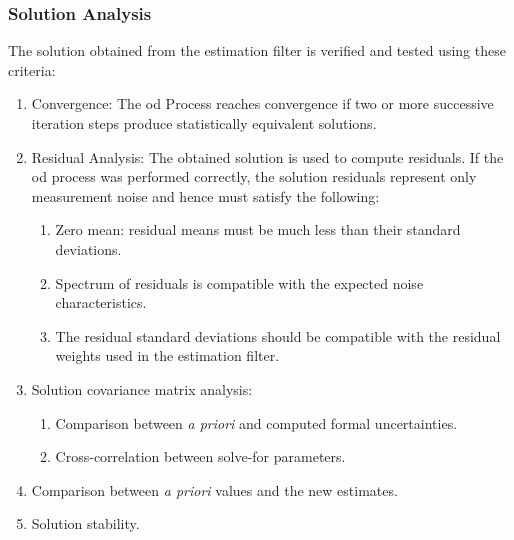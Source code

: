 \documentclass{article}
\begin{document}
                \subsubsection{\footnotesize{Solution Analysis}}
                    The solution obtained from the estimation filter
                    is verified and tested using these criteria:
                    \begin{enumerate}
                        \item Convergence: The \gls{od}
                              Process reaches convergence if two
                              or more successive iteration steps
                              produce statistically equivalent
                              solutions.
                        \item Residual Analysis: The obtained
                              solution is used to compute
                              \glspl{residual}. If the \gls{od}
                              process was performed correctly,
                              the solution \glspl{residual}
                              represent only measurement noise
                              and hence must satisfy the following:
                    \begin{enumerate}
                        \item Zero mean: \Gls{residual} means must be much
                              less than their standard deviations.
                        \item Spectrum of \glspl{residual} is compatible with
                              the expected noise characteristics.
                        \item The \gls{residual} standard deviations should be
                              compatible with the \gls{residual} weights used
                              in the estimation filter.
                    \end{enumerate}
                        \item Solution \gls{covariance matrix} analysis:
                        \begin{enumerate}
                        \item Comparison between \textit{a priori} and computed formal uncertainties.
                        \item Cross-correlation between \gls{solve-for parameters}.
                        \end{enumerate}
                        \item Comparison between \textit{a priori} values and the new estimates.
                        \item Solution stability.
                        \end{enumerate}
\end{document}
